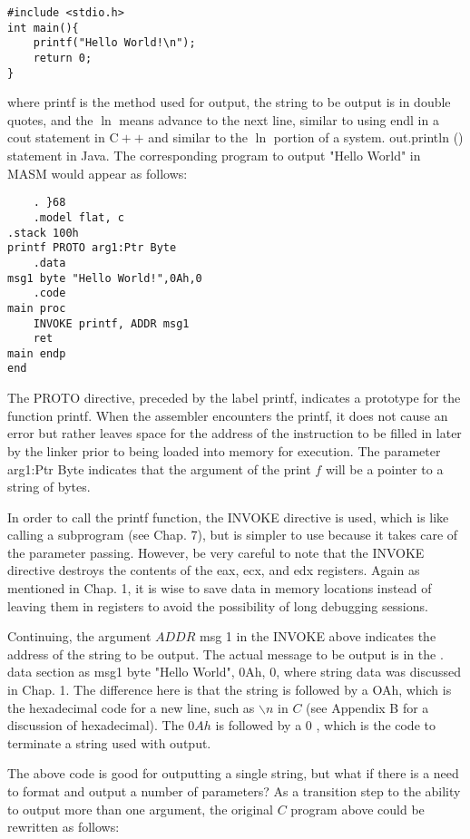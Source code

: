 \documentclass[10pt]{article}
\begin{document}
\begin{verbatim}
#include <stdio.h>
int main(){
    printf("Hello World!\n");
    return 0;
}
\end{verbatim}

where printf is the method used for output, the string to be output is in double quotes, and the $\ln$ means advance to the next line, similar to using endl in a cout statement in $\mathrm{C}++$ and similar to the $\ln$ portion of a system. out.println () statement in Java. The corresponding program to output "Hello World" in MASM would appear as follows:

\begin{verbatim}
    . }68
    .model flat, c
.stack 100h
printf PROTO arg1:Ptr Byte
    .data
msg1 byte "Hello World!",0Ah,0
    .code
main proc
    INVOKE printf, ADDR msg1
    ret
main endp
end
\end{verbatim}

The PROTO directive, preceded by the label printf, indicates a prototype for the function printf. When the assembler encounters the printf, it does not cause an error but rather leaves space for the address of the instruction to be filled in later by the linker prior to being loaded into memory for execution. The parameter arg1:Ptr Byte indicates that the argument of the print $f$ will be a pointer to a string of bytes.

In order to call the printf function, the INVOKE directive is used, which is like calling a subprogram (see Chap. 7), but is simpler to use because it takes care of the parameter passing. However, be very careful to note that the INVOKE directive destroys the contents of the eax, ecx, and edx registers. Again as mentioned in Chap. 1, it is wise to save data in memory locations instead of leaving them in registers to avoid the possibility of long debugging sessions.

Continuing, the argument $A D D R$ msg 1 in the INVOKE above indicates the address of the string to be output. The actual message to be output is in the . data section as msg1 byte "Hello World", 0Ah, 0, where string data was discussed in Chap. 1. The difference here is that the string is followed by a OAh, which is the hexadecimal code for a new line, such as $\backslash n$ in $C$ (see Appendix B for a discussion of hexadecimal). The $0 A h$ is followed by a 0 , which is the code to terminate a string used with output.

The above code is good for outputting a single string, but what if there is a need to format and output a number of parameters? As a transition step to the ability to output more than one argument, the original $C$ program above could be rewritten as follows:
\end{document}
